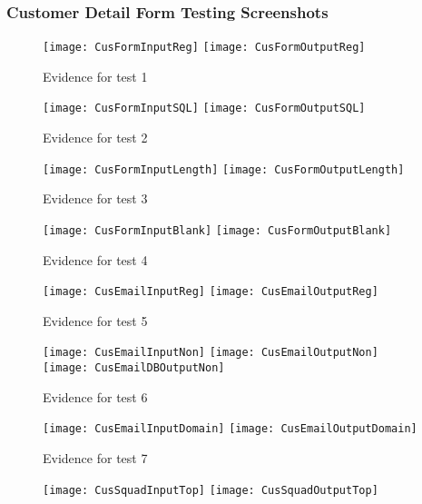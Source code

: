 \documentclass[
11pt, %
a4paper, %
oneside, %
headinclude,footinclude, %
BCOR5mm, %
]{scrartcl}
\begin{document}
\begin{appendices}
{{{{{{{{{{{{{{\subsubsection{Customer Detail Form Testing Screenshots}
\begin{figure}[H]
	\centering
	\texttt{[image: CusFormInputReg]}
	\texttt{[image: CusFormOutputReg]}
	\caption[Evidence C.1.1 Test 1]{Evidence for test 1}
	\label{cusdettes1}	
\end{figure}
\begin{figure}[H]
	\centering
	\texttt{[image: CusFormInputSQL]}
	\texttt{[image: CusFormOutputSQL]}
	\caption[Evidence C.1.1 Test 2]{Evidence for test 2}
	\label{cusdettes2}
\end{figure}
\begin{figure}[H]
	\centering
	\texttt{[image: CusFormInputLength]}
	\texttt{[image: CusFormOutputLength]}
	\caption[Evidence C.1.1 Test 3]{Evidence for test 3}
	\label{cusdettes3}
\end{figure}
\begin{figure}[H]
	\centering
	\texttt{[image: CusFormInputBlank]}
	\texttt{[image: CusFormOutputBlank]}
	\caption[Evidence C.1.1 Test 4]{Evidence for test 4}
	\label{cusdettes4}	
\end{figure}
\begin{figure}[H]
	\centering
	\texttt{[image: CusEmailInputReg]}
	\texttt{[image: CusEmailOutputReg]}
	\caption[Evidence C.1.1 Test 5]{Evidence for test 5}
	\label{cusdettes5}	
\end{figure}
\begin{figure}[H]
	\centering
	\texttt{[image: CusEmailInputNon]}
	\texttt{[image: CusEmailOutputNon]}
	\texttt{[image: CusEmailDBOutputNon]}
	\caption[Evidence C.1.1 Test 6]{Evidence for test 6}	
	\label{cusdettes6}
\end{figure}
\begin{figure}
	\centering
	\texttt{[image: CusEmailInputDomain]}
	\texttt{[image: CusEmailOutputDomain]}
	\caption[Evidence C.1.1 Test 7]{Evidence for test 7}
	\label{cusdettes7}	
\end{figure}
\begin{figure}[H]
	\centering
	\texttt{[image: CusSquadInputTop]}
	\texttt{[image: CusSquadOutputTop]}

\end{figure}}}}}}}}}}}}}}}
\end{appendices}
\end{document}
